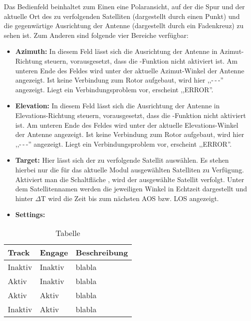 Das Bedienfeld beinhaltet zum Einen eine Polaransicht, auf der die Spur und der aktuelle Ort des zu verfolgenden Satelliten (dargestellt durch einen Punkt) und die gegenwärtige Ausrichtung der Antenne (dargestellt durch ein Fadenkreuz) zu sehen ist. Zum Anderen sind folgende vier Bereiche verfügbar:

\begin{itemize}
	\parskip0pt
	\item \textbf{Azimuth:} In diesem Feld lässt sich die Ausrichtung der Antenne in Azimut-Richtung steuern, vorausgesetzt, dass die -Funktion nicht aktiviert ist. Am unteren Ende des Feldes wird unter  der aktuelle Azimut-Winkel der Antenne angezeigt. Ist keine Verbindung zum Rotor aufgebaut, wird hier ,,-\,-\,-'' angezeigt. Liegt ein Verbindungsproblem vor, erscheint ,,ERROR''.
	\item \textbf{Elevation:} In diesem Feld lässt sich die Ausrichtung der Antenne in Elevations-Richtung steuern, vorausgesetzt, dass die -Funktion nicht aktiviert ist. Am unteren Ende des Feldes wird unter  der aktuelle Elevations-Winkel der Antenne angezeigt. Ist keine Verbindung zum Rotor aufgebaut, wird hier ,,-\,-\,-'' angezeigt. Liegt ein Verbindungsproblem vor, erscheint ,,ERROR''.
	\item \textbf{Target:} Hier lässt sich der zu verfolgende Satellit auswählen. Es stehen hierbei nur die für das aktuelle Modul ausgewählten Satelliten zu Verfügung. Aktiviert man die Schaltfläche , wird der ausgewählte Satellit verfolgt. Unter dem Satellitennamen werden die jeweiligen Winkel in Echtzeit dargestellt und hinter $\Delta$T wird die Zeit bis zum nächsten \ac{AOS} bzw. \ac{LOS} angezeigt.
	\clearpage
	\item \textbf{Settings:} 
\end{itemize}

\begin{table}[h]
	\begin{tabularx}{\textwidth}{|l|l|X|}
		\hline
		\textbf{Track} 	    & \textbf{Engage}	&\textbf{Beschreibung}\\
		\hline
		Inaktiv          	& Inaktiv 			& blabla \\
		Aktiv              	& Inaktiv   		& blabla \\
		Aktiv              	& Aktiv	            & blabla \\
		Inaktiv            	& Aktiv   			& blabla \\
		\hline		
	\end{tabularx}
	\caption{Tabelle}
	\label{tab:test}
\end{table}

